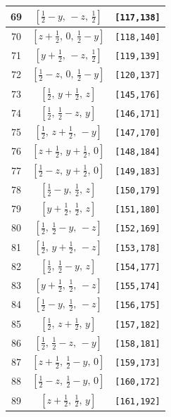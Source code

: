\documentclass[fleqn,8pt]{jsarticle}
\begin{document}
\begin{longtable}{ccc}
69 & $\left[ \frac{1}{2} - y,\, - z,\, \frac{1}{2} \right]$ & {\tt [117,138]} \\ \hline
70 & $\left[ z + \frac{1}{2},\, 0,\, \frac{1}{2} - y \right]$ & {\tt [118,140]} \\ \hline
71 & $\left[ y + \frac{1}{2},\, - z,\, \frac{1}{2} \right]$ & {\tt [119,139]} \\ \hline
72 & $\left[ \frac{1}{2} - z,\, 0,\, \frac{1}{2} - y \right]$ & {\tt [120,137]} \\ \hline
73 & $\left[ \frac{1}{2},\, y + \frac{1}{2},\, z \right]$ & {\tt [145,176]} \\ \hline
74 & $\left[ \frac{1}{2},\, \frac{1}{2} - z,\, y \right]$ & {\tt [146,171]} \\ \hline
75 & $\left[ \frac{1}{2},\, z + \frac{1}{2},\, - y \right]$ & {\tt [147,170]} \\ \hline
76 & $\left[ z + \frac{1}{2},\, y + \frac{1}{2},\, 0 \right]$ & {\tt [148,184]} \\ \hline
77 & $\left[ \frac{1}{2} - z,\, y + \frac{1}{2},\, 0 \right]$ & {\tt [149,183]} \\ \hline
78 & $\left[ \frac{1}{2} - y,\, \frac{1}{2},\, z \right]$ & {\tt [150,179]} \\ \hline
79 & $\left[ y + \frac{1}{2},\, \frac{1}{2},\, z \right]$ & {\tt [151,180]} \\ \hline
80 & $\left[ \frac{1}{2},\, \frac{1}{2} - y,\, - z \right]$ & {\tt [152,169]} \\ \hline
81 & $\left[ \frac{1}{2},\, y + \frac{1}{2},\, - z \right]$ & {\tt [153,178]} \\ \hline
82 & $\left[ \frac{1}{2},\, \frac{1}{2} - y,\, z \right]$ & {\tt [154,177]} \\ \hline
83 & $\left[ y + \frac{1}{2},\, \frac{1}{2},\, - z \right]$ & {\tt [155,174]} \\ \hline
84 & $\left[ \frac{1}{2} - y,\, \frac{1}{2},\, - z \right]$ & {\tt [156,175]} \\ \hline
85 & $\left[ \frac{1}{2},\, z + \frac{1}{2},\, y \right]$ & {\tt [157,182]} \\ \hline
86 & $\left[ \frac{1}{2},\, \frac{1}{2} - z,\, - y \right]$ & {\tt [158,181]} \\ \hline
87 & $\left[ z + \frac{1}{2},\, \frac{1}{2} - y,\, 0 \right]$ & {\tt [159,173]} \\ \hline
88 & $\left[ \frac{1}{2} - z,\, \frac{1}{2} - y,\, 0 \right]$ & {\tt [160,172]} \\ \hline
89 & $\left[ z + \frac{1}{2},\, \frac{1}{2},\, y \right]$ & {\tt [161,192]} \\ \hline

\end{longtable}
\end{document}
